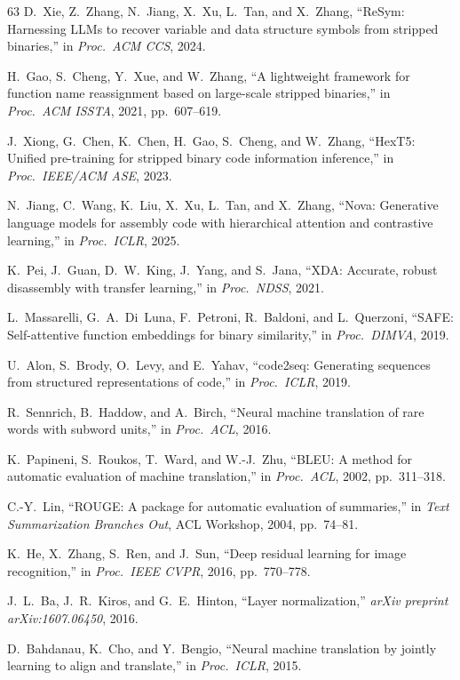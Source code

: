 \documentclass[sigconf,nonacm]{acmart}
\begin{document}
{\begin{thebibliography}{63}
D.~Xie, Z.~Zhang, N.~Jiang, X.~Xu, L.~Tan, and X.~Zhang, ``ReSym: Harnessing LLMs to recover variable and data structure symbols from stripped binaries,'' in \emph{Proc.\ ACM CCS}, 2024.

H.~Gao, S.~Cheng, Y.~Xue, and W.~Zhang, ``A lightweight framework for function name reassignment based on large-scale stripped binaries,'' in \emph{Proc.\ ACM ISSTA}, 2021, pp.~607--619.

J.~Xiong, G.~Chen, K.~Chen, H.~Gao, S.~Cheng, and W.~Zhang, ``HexT5: Unified pre-training for stripped binary code information inference,'' in \emph{Proc.\ IEEE/ACM ASE}, 2023.

N.~Jiang, C.~Wang, K.~Liu, X.~Xu, L.~Tan, and X.~Zhang, ``Nova: Generative language models for assembly code with hierarchical attention and contrastive learning,'' in \emph{Proc.\ ICLR}, 2025.

K.~Pei, J.~Guan, D.~W.~King, J.~Yang, and S.~Jana, ``XDA: Accurate, robust disassembly with transfer learning,'' in \emph{Proc.\ NDSS}, 2021.

L.~Massarelli, G.~A.~Di~Luna, F.~Petroni, R.~Baldoni, and L.~Querzoni, ``SAFE: Self-attentive function embeddings for binary similarity,'' in \emph{Proc.\ DIMVA}, 2019.

U.~Alon, S.~Brody, O.~Levy, and E.~Yahav, ``code2seq: Generating sequences from structured representations of code,'' in \emph{Proc.\ ICLR}, 2019.

R.~Sennrich, B.~Haddow, and A.~Birch, ``Neural machine translation of rare words with subword units,'' in \emph{Proc.\ ACL}, 2016.

K.~Papineni, S.~Roukos, T.~Ward, and W.-J.~Zhu, ``BLEU: A method for automatic evaluation of machine translation,'' in \emph{Proc.\ ACL}, 2002, pp.~311--318.

C.-Y.~Lin, ``ROUGE: A package for automatic evaluation of summaries,'' in \emph{Text Summarization Branches Out}, ACL Workshop, 2004, pp.~74--81.

K.~He, X.~Zhang, S.~Ren, and J.~Sun, ``Deep residual learning for image recognition,'' in \emph{Proc.\ IEEE CVPR}, 2016, pp.~770--778.

J.~L.~Ba, J.~R.~Kiros, and G.~E.~Hinton, ``Layer normalization,'' \emph{arXiv preprint arXiv:1607.06450}, 2016.

D.~Bahdanau, K.~Cho, and Y.~Bengio, ``Neural machine translation by jointly learning to align and translate,'' in \emph{Proc.\ ICLR}, 2015.


\end{thebibliography}}
\end{document}
